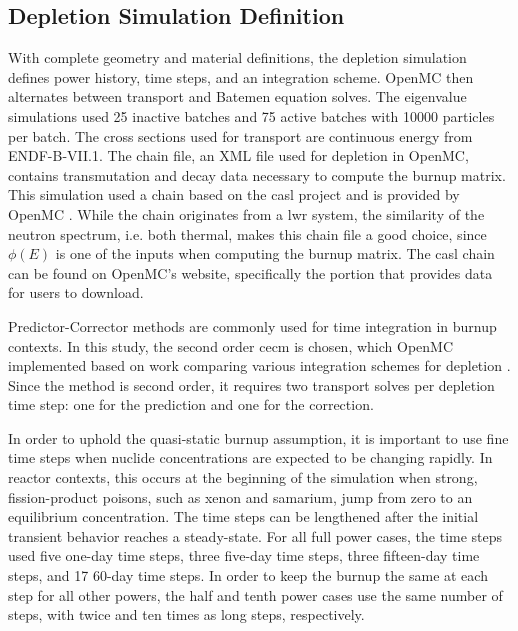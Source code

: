 \documentclass[letterpaper]{physor2024}
\begin{document}
\subsection{Depletion Simulation Definition}\label{sec:depl_sim}
With complete geometry and material definitions, the depletion simulation defines power history, time steps, and an integration scheme. OpenMC then alternates between transport and Batemen equation solves. The eigenvalue simulations used 25 inactive batches and 75 active batches with 10000 particles per batch. The cross sections used for transport are continuous energy from ENDF-B-VII.1. The chain file, an XML file used for depletion in OpenMC, contains transmutation and decay data necessary to compute the burnup matrix. This simulation used a chain based on the \gls{casl} project \cite{CASL-report} and is provided by OpenMC \cite{openmc-chains}. While the chain originates from a \gls{lwr} system, the similarity of the neutron spectrum, i.e. both thermal, makes this chain file a good choice, since $\phi(E)$ is one of the inputs when computing the burnup matrix. The \gls{casl} chain can be found on OpenMC's website, specifically the portion that provides data for users to download.

Predictor-Corrector methods are commonly used for time integration in burnup contexts. In this study, the second order \gls{cecm} is chosen, which OpenMC implemented based on work comparing various integration schemes for depletion \cite{isotalo_comparison_2015}. Since the method is second order, it requires two transport solves per depletion time step: one for the prediction and one for the correction.

In order to uphold the quasi-static burnup assumption, it is important to use fine time steps when nuclide concentrations are expected to be changing rapidly. In reactor contexts, this occurs at the beginning of the simulation when strong, fission-product poisons, such as xenon and samarium, jump from zero to an equilibrium concentration. The time steps can be lengthened after the initial transient behavior reaches a steady-state. For all full power cases, the time steps used five one-day time steps, three five-day time steps, three fifteen-day time steps, and 17 60-day time steps. In order to keep the burnup the same at each step for all other powers, the half and tenth power cases use the same number of steps, with twice and ten times as long steps, respectively.
\end{document}
